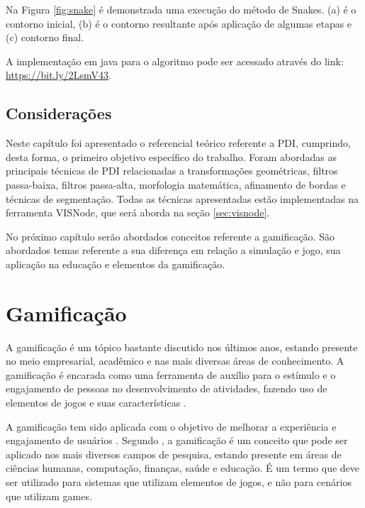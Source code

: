 \documentclass[
	12pt,				%
	oneside,			%
	a4paper,			%
	english,			%
	french,				%
	spanish,			%
	brazil,				%
	]{abntex2}
\begin{document}
Na Figura \ref{fig:snake} é demonstrada uma execução do método de Snakes. (a) é o contorno inicial, (b) é o contorno resultante após aplicação de algumas etapas e (c) contorno final.

A implementação em java para o algoritmo pode ser acessado através do link: \url{https://bit.ly/2LsmV43}.

\section{Considerações}

Neste capítulo foi apresentado o referencial teórico referente a PDI, cumprindo, desta forma, o primeiro objetivo específico do trabalho. Foram abordadas as principais técnicas de PDI relacionadas a transformações geométricas, filtros passa-baixa, filtros passa-alta, morfologia matemática, afinamento de bordas e técnicas de segmentação. Todas as técnicas apresentadas estão implementadas na ferramenta VISNode, que será aborda na seção \ref{sec:visnode}.

No próximo capítulo serão abordados conceitos referente a gamificação. São abordados temas referente a sua diferença em relação a simulação e jogo, sua aplicação na educação e elementos da gamificação.

\chapter{Gamificação}
\label{sec:gamificacao}

A gamificação é um tópico bastante discutido nos últimos anos, estando presente no meio empresarial, acadêmico e nas mais diversas áreas de conhecimento. A gamificação é encarada como uma ferramenta de auxílio para o estímulo e o engajamento de pessoas no desenvolvimento de atividades, fazendo uso de elementos de jogos e suas características \cite{quadros2016gamificaccao}.

A gamificação tem sido aplicada com o objetivo de melhorar a experiência e engajamento de usuários \cite{quadros2016gamificaccao}. Segundo \citet{deterding2011game}, a gamificação é um conceito que pode ser aplicado nos mais diversos campos de pesquisa, estando presente em áreas de ciências humanas, computação, finanças, saúde e educação. É um termo que deve ser utilizado para sistemas que utilizam elementos de jogos, e não para cenários que utilizam games. 
\end{document}
